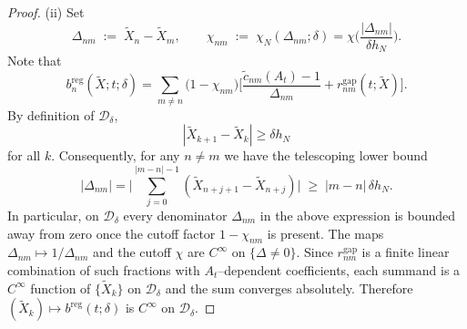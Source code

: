 \documentclass[12pt,reqno]{amsart}
\theoremstyle{plain}
\theoremstyle{definition}
\theoremstyle{remark}
\begin{document}
\begin{proof}
(ii) Set
\begin{equation}
\Delta_{nm}\;:=\;\widetilde X_n-\widetilde X_m,\qquad
\chi_{nm}\;:=\;\chi_N(\Delta_{nm};\delta)
=\chi\!\Big(\frac{|\Delta_{nm}|}{\delta h_N}\Big).
\end{equation}
Note that
\begin{equation}
b^{\mathrm{reg}}_{n}(\widetilde X;t;\delta)
=\sum_{m\neq n}\Big(1-\chi_{nm}\Big)\Bigg[
      \frac{\widetilde c_{nm}(A_t)-1}{\Delta_{nm}}
      + r^{\mathrm{gap}}_{nm}(t;\widetilde X)\Bigg].
\end{equation}
By definition of $\mathcal D_\delta$,
\begin{equation} 
|\widetilde X_{k+1}-\widetilde X_k|\ge \delta h_N
\end{equation} for all $k$. Consequently, for any $n\neq m$ we have the telescoping lower bound
\begin{equation}\label{eq:LB-j}
|\Delta_{nm}|
=\Big|\sum_{j=0}^{|m-n|-1}
(\widetilde X_{n+j+1}-\widetilde X_{n+j})\Big|
\;\ge\; |m-n|\,\delta h_N .
\end{equation}
In particular, on $\mathcal D_\delta$ every denominator
$\Delta_{nm}$ in the above expression is bounded away from zero once the cutoff factor $1-\chi_{nm}$ is present.
The maps $\Delta_{nm} \mapsto 1/\Delta_{nm}$ and the cutoff $\chi$ are $C^\infty$ on $\{\Delta\neq0\}$.
Since $r^{\mathrm{gap}}_{nm}$ is a finite linear combination of such
fractions with $A_t$–dependent coefficients,
each summand is a $C^\infty$ function of $\{\widetilde X_k\}$ on
$\mathcal D_\delta$ and the sum converges absolutely. Therefore $(\widetilde X_k)\mapsto b^{\mathrm{reg}}(t;\delta)$
is $C^\infty$ on $\mathcal D_\delta$.



\end{proof}
\end{document}
